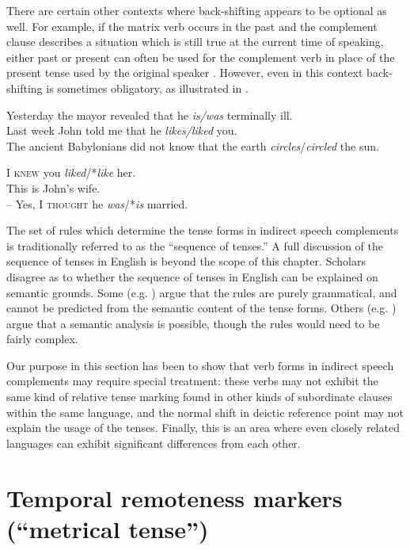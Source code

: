 There are certain other contexts where back-shifting appears to be optional as well. For example, if the matrix verb occurs in the past and the complement clause describes a situation which is still true at the current time of speaking, either past or present can often be used for the complement verb in place of the present tense used by the original speaker . However, even in this context back-shifting is sometimes obligatory, as illustrated in .


\ea \label{ex:21.34}
\ea  Yesterday the mayor revealed that he \textit{is/was} terminally ill.\\
\ex Last week John told me that he \textit{likes/liked} you.\\
\ex The ancient Babylonians did not know that the earth \textit{circles}/\textit{circled} the sun.
                       \z
\z

\ea \label{ex:21.35}
\ea  I \textsc{knew} you \textit{liked}/*\textit{like} her.\\
\ex This is John’s wife.\\
  – Yes, I \textsc{thought} he \textit{was}/*\textit{is} married.
                       \z
\z


The set of rules which determine the tense forms in indirect speech complements is traditionally referred to as the “sequence of tenses.” A full discussion of the sequence of tenses in English is beyond the scope of this chapter. Scholars disagree as to whether the sequence of tenses in English can be explained on semantic grounds. Some (e.g. \citealt{Comrie1985}) argue that the rules are purely grammatical, and cannot be predicted from the semantic content of the tense forms. Others (e.g. \citealt{Declerck1991}) argue that a semantic analysis is possible, though the rules would need to be fairly complex.



Our purpose in this section has been to show that verb forms in indirect speech complements may require special treatment: these verbs may not exhibit the same kind of relative tense marking found in other kinds of subordinate clauses within the same language, and the normal shift in deictic reference point may not explain the usage of the tenses. Finally, this is an area where even closely related languages can exhibit significant differences from each other.


\section{Temporal remoteness markers (“metrical tense”)}\label{sec:21.5}

